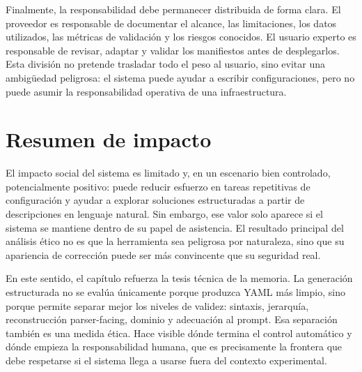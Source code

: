 Finalmente, la responsabilidad debe permanecer distribuida de forma clara. El proveedor es
responsable de documentar el alcance, las limitaciones, los datos utilizados, las métricas de
validación y los riesgos conocidos. El usuario experto es responsable de revisar, adaptar y
validar los manifiestos antes de desplegarlos. Esta división no pretende trasladar todo el peso
al usuario, sino evitar una ambigüedad peligrosa: el sistema puede ayudar a escribir
configuraciones, pero no puede asumir la responsabilidad operativa de una infraestructura.


\section{Resumen de impacto}
\label{sec:ch8_synthesis}

El impacto social del sistema es limitado y, en un escenario bien controlado, potencialmente
positivo: puede reducir esfuerzo en tareas repetitivas de configuración y ayudar a explorar
soluciones estructuradas a partir de descripciones en lenguaje natural. Sin embargo, ese valor
solo aparece si el sistema se mantiene dentro de su papel de asistencia. El resultado principal
del análisis ético no es que la herramienta sea peligrosa por naturaleza, sino que su apariencia
de corrección puede ser más convincente que su seguridad real.

En este sentido, el capítulo refuerza la tesis técnica de la memoria. La generación estructurada
no se evalúa únicamente porque produzca YAML más limpio, sino porque permite separar mejor los
niveles de validez: sintaxis, jerarquía, reconstrucción parser-facing, dominio y adecuación al
prompt. Esa separación también es una medida ética. Hace visible dónde termina el control
automático y dónde empieza la responsabilidad humana, que es precisamente la frontera que debe
respetarse si el sistema llega a usarse fuera del contexto experimental.

